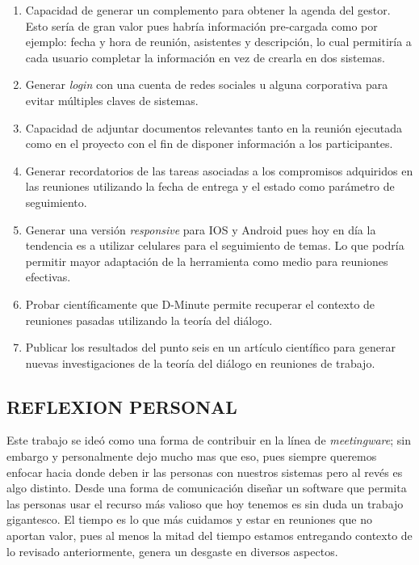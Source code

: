 \begin{enumerate}[1.]
	\item Capacidad de generar un complemento para obtener la agenda del gestor. Esto sería de gran valor pues habría información pre-cargada como por ejemplo: fecha y hora de reunión, asistentes y descripción, lo cual permitiría a cada usuario completar la información en vez de crearla en dos sistemas.
	\item Generar \textit{login} con una cuenta de redes sociales u alguna corporativa para evitar múltiples claves de sistemas.
	\item Capacidad de adjuntar documentos relevantes tanto en la reunión ejecutada como en el proyecto con el fin de disponer información a los participantes.
	\item Generar recordatorios de las tareas asociadas a los compromisos adquiridos en las reuniones utilizando la fecha de entrega y el estado como parámetro de seguimiento. 
	\item Generar una versión \textit{responsive} para IOS y Android pues hoy en día la tendencia es a utilizar celulares para el seguimiento de temas. Lo que podría permitir mayor adaptación de la herramienta como medio para reuniones efectivas.
	\item Probar científicamente que D-Minute permite recuperar el contexto de reuniones pasadas utilizando la teoría del diálogo. 
	\item Publicar los resultados del punto seis en un artículo científico para generar nuevas investigaciones de la teoría del diálogo en reuniones de trabajo.

\end{enumerate}

\subsection{REFLEXION PERSONAL}

Este trabajo se ideó como una forma de contribuir en la línea de \textit{meetingware}; sin embargo y personalmente dejo mucho mas que eso, pues siempre queremos enfocar hacia donde deben ir las personas con nuestros sistemas pero al revés es algo distinto. Desde una forma de comunicación diseñar un software que permita las personas usar el recurso más valioso que hoy tenemos es sin duda un trabajo gigantesco. El tiempo es lo que más cuidamos y estar en reuniones que no aportan valor, pues al menos la mitad del tiempo estamos entregando contexto de lo revisado anteriormente, genera un desgaste en diversos aspectos.

